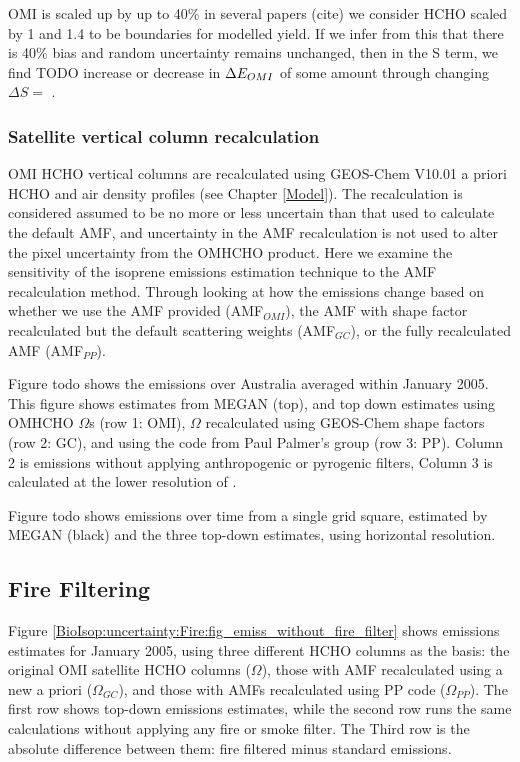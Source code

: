       OMI is scaled up by up to 40\% in several papers (cite) we consider HCHO scaled by 1 and 1.4 to be boundaries for modelled yield.
      If we infer from this that there is 40\% bias and random uncertainty remains unchanged, then in the S term, we find TODO increase or decrease in $\Delta{E_{OMI}}$ of some amount through changing $\Delta{S}=$ .
    
    
    \subsubsection{Satellite vertical column recalculation}
      \label{BioIsop:uncertainty:satellite:AMF}
      OMI HCHO vertical columns are recalculated using GEOS-Chem V10.01 a priori HCHO and air density profiles (see Chapter \ref{Model}).
      The recalculation is considered assumed to be no more or less uncertain than that used to calculate the default AMF, and uncertainty in the AMF recalculation is not used to alter the pixel uncertainty from the OMHCHO product.
      Here we examine the sensitivity of the isoprene emissions estimation technique to the AMF recalculation method.
      Through looking at how the emissions change based on whether we use the AMF provided (AMF$_{OMI}$), the AMF with shape factor recalculated but the default scattering weights (AMF$_{GC}$), or the fully recalculated AMF (AMF$_{PP}$).
      
      Figure todo shows the emissions over Australia averaged within January 2005.
      This figure shows estimates from MEGAN (top), and top down estimates using OMHCHO $\Omega$s (row 1: OMI), $\Omega$ recalculated using GEOS-Chem shape factors (row 2: GC), and using the code from Paul Palmer's group (row 3: PP).
      Column 2 is emissions without applying anthropogenic or pyrogenic filters, Column 3 is calculated at the lower resolution of \lowhr.
      
      Figure todo shows emissions over time from a single grid square, estimated by MEGAN (black) and the three top-down estimates, using \lowhr horizontal resolution.
  
  \subsection{Fire Filtering}
    
    Figure \ref{BioIsop:uncertainty:Fire:fig_emiss_without_fire_filter} shows emissions estimates for January 2005, using three different HCHO columns as the basis: the original OMI satellite HCHO columns ($\Omega$), those with AMF recalculated using a new a priori ($\Omega_{GC}$), and those with AMFs recalculated using PP code ($\Omega_{PP}$).
    The first row shows top-down emissions estimates, while the second row runs the same calculations without applying any fire or smoke filter.
    The Third row is the absolute difference between them: fire filtered minus standard emissions.
    
